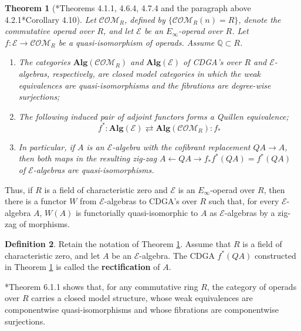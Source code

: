 \documentclass[11pt]{amsart}
\newtheorem{theorem}{Theorem}[section]
\theoremstyle{definition}
\newtheorem{definition}[theorem]{Definition}
\numberwithin{equation}{section}
\numberwithin{equation}{section}
\newcommand\QQ{\mathbb{Q}}
\begin{document}
\begin{theorem}[\cite{Hinich-Model-Structure-on-homotopy-algbras}*{Theorems 4.1.1, 4.6.4, 4.7.4 and the paragraph above 4.2.1}\cite{White-E-infinity-algebra-characteristic-zero}*{Corollary 4.10}]\label{Fact: rectification}
Let $\mathcal{COM}_R$, defined by $\{\mathcal{COM}_R(n)=R\}$, denote the commutative operad over $R$, and let $\mathcal{E}$ be an $E_{\infty}$-operad over $R$. Let $f:\mathcal{E}\rightarrow \mathcal{COM}_R$ be a quasi-isomorphism of operads. Assume $\QQ\subset R$.
\begin{enumerate}[leftmargin=0.25in]
    \item The categories $\mathbf{Alg}(\mathcal{COM}_R)$ and $\mathbf{Alg}(\mathcal{E})$ of CDGA's over $R$ and $\mathcal{E}$-algebras, respectively, are closed model categories in which the weak equivalences are quasi-isomorphisms and the fibrations are degree-wise surjections;
    \item The following induced pair of adjoint functors forms a Quillen equivalence; \[
    f^*:\mathbf{Alg}(\mathcal{E})\rightleftarrows \mathbf{Alg}(\mathcal{COM}_R):f_*
    \]
    \item In particular, if $A$ is an $\mathcal{E}$-algebra with the cofibrant replacement $QA\rightarrow A$, then both maps in the resulting zig-zag $A\leftarrow QA\rightarrow f_*f^*(QA)=f^*(QA)$ of $\mathcal{E}$-algebras are quasi-isomorphisms.
\end{enumerate}
\end{theorem}

Thus, if $R$ is a field of characteristic zero and $\mathcal{E}$ is an $E_{\infty}$-operad over $R$, then there is a functor $W$ from $\mathcal{E}$-algebras to CDGA's over $R$ such that, for every $\mathcal{E}$-algebra $A$, $W(A)$ is functorially quasi-isomorphic to $A$ as $\mathcal{E}$-algebras by a zig-zag of morphisms.

\begin{definition}\label{Def: rectification of an E-infinity algebra}
Retain the notation of Theorem \ref{Fact: rectification}.
Assume that $R$ is a field of characteristic zero, and let $A$ be an $\mathcal{E}$-algebra. The CDGA $f^*(QA)$ constructed in Theorem \ref{Fact: rectification} is called the \textbf{rectification} of $A$.   
\end{definition}

\cite{Hinich-Model-Structure-on-homotopy-algbras}*{Theorem 6.1.1} shows that, for any commutative ring $R$, the category of operads over $R$ carries a closed model structure, whose weak equivalences are componentwise quasi-isomorphisms and whose fibrations are componentwise surjections.
\end{document}
